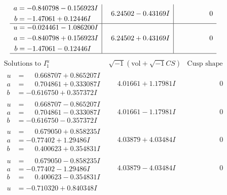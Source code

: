 \documentclass[1p]{elsarticle_modified}
\theoremstyle{definition}
\newcommand{\I}{\sqrt{-1}}
\begin{document}
$$\begin{array}{c|c|c}
\begin{aligned}
a &= -0.840798 - 0.156923 I \\
b &= -1.47061 + 0.12446 I\end{aligned}
 & \phantom{-}6.24502 - 0.43169 I & \phantom{-0.000000 } 0 \\ \hline\begin{aligned}
u &= -0.024461 - 1.086200 I \\
a &= -0.840798 + 0.156923 I \\
b &= -1.47061 - 0.12446 I\end{aligned}
 & \phantom{-}6.24502 + 0.43169 I & \phantom{-0.000000 } 0\\
 \hline 
 \end{array}$$\newpage$$\begin{array}{c|c|c}  
\text{Solutions to }I^u_{1}& \I (\text{vol} + \sqrt{-1}CS) & \text{Cusp shape}\\
 \hline 
\begin{aligned}
u &= \phantom{-}0.668707 + 0.865207 I \\
a &= \phantom{-}0.704861 + 0.333087 I \\
b &= -0.616750 + 0.357372 I\end{aligned}
 & \phantom{-}4.01661 + 1.17981 I & \phantom{-0.000000 } 0 \\ \hline\begin{aligned}
u &= \phantom{-}0.668707 - 0.865207 I \\
a &= \phantom{-}0.704861 - 0.333087 I \\
b &= -0.616750 - 0.357372 I\end{aligned}
 & \phantom{-}4.01661 - 1.17981 I & \phantom{-0.000000 } 0 \\ \hline\begin{aligned}
u &= \phantom{-}0.679050 + 0.858235 I \\
a &= -0.77402 + 1.29486 I \\
b &= \phantom{-}0.400623 + 0.354831 I\end{aligned}
 & \phantom{-}4.03879 + 4.03484 I & \phantom{-0.000000 } 0 \\ \hline\begin{aligned}
u &= \phantom{-}0.679050 - 0.858235 I \\
a &= -0.77402 - 1.29486 I \\
b &= \phantom{-}0.400623 - 0.354831 I\end{aligned}
 & \phantom{-}4.03879 - 4.03484 I & \phantom{-0.000000 } 0 \\ \hline\begin{aligned}
u &= -0.710320 + 0.840348 I \\

\end{aligned}
\end{array}$$
\end{document}
